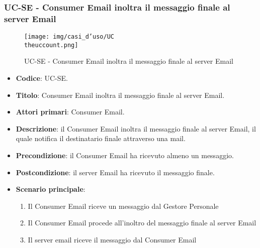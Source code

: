 \subsubsection{UC\theuccount-SE - Consumer Email inoltra il messaggio finale al server Email}
	\begin{figure}[H]
		\centering
		\texttt{[image: img/casi\_d'uso/UC\\theuccount.png]}\\
		\caption{UC\theuccount-SE - Consumer Email inoltra il messaggio finale al server Email}
	\end{figure}
	\begin{itemize}
		\item \textbf{Codice}: UC\theuccount-SE.
		\item \textbf{Titolo}: Consumer Email inoltra il messaggio finale al server Email.
		\item \textbf{Attori primari}: Consumer Email.
		\item \textbf{Descrizione}: il Consumer Email inoltra il messaggio finale al server Email, il quale notifica il destinatario finale attraverso una mail.
		\item \textbf{Precondizione}: il Consumer Email ha ricevuto almeno un messaggio.
		\item \textbf{Postcondizione}: il server Email ha ricevuto il messaggio finale.
		\item \textbf{Scenario principale}:
		\begin{enumerate}
			\item Il Consumer Email riceve un messaggio dal Gestore Personale
			\item Il Consumer Email procede all'inoltro del messaggio finale al server Email
            \item Il server email riceve il messaggio dal Consumer Email
		\end{enumerate}

	\end{itemize}
